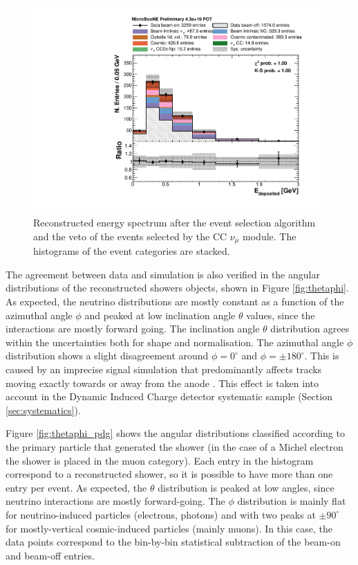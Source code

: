 \begin{figure}[htbp]
\centering
  \includegraphics[width=0.65\linewidth]{figures/h_fixed_energy.pdf}
  \caption{Reconstructed energy spectrum after the event selection algorithm and the veto of the events selected by the CC $\nu_{\mu}$ module. The histograms of the event categories are stacked.}
  \label{fig:spectrum}
\end{figure}

The agreement between data and simulation is also verified in the angular distributions of the reconstructed showers objects, shown in Figure \ref{fig:thetaphi}. As expected, the neutrino distributions are mostly constant as a function of the azimuthal angle $\phi$ and peaked at low inclination angle $\theta$ values, since the interactions are mostly forward going. The inclination angle $\theta$ distribution agrees within the uncertainties both for shape and normalisation. The azimuthal angle $\phi$ distribution shows a slight disagreement around $\phi = 0^{\circ}$ and $\phi = \pm180^{\circ}$. This is caused by an imprecise signal simulation that predominantly affects tracks moving exactly towards or away from the anode \cite{Adams:2018gbi}. This effect is taken into account in the Dynamic Induced Charge detector systematic sample (Section \ref{sec:systematics}). 

Figure \ref{fig:thetaphi_pdg} shows the angular distributions classified according to the primary particle that generated the shower (in the case of a Michel electron the shower is placed in the muon category). Each entry in the histogram correspond to a reconstructed shower, so it is possible to have more than one entry per event. As expected, the $\theta$ distribution is peaked at low angles, since neutrino interactions are mostly forward-going. The $\phi$ distribution is mainly flat for neutrino-induced particles (electrons, photons) and with two peaks at $\pm90^{\circ}$ for mostly-vertical cosmic-induced particles (mainly muons). In this case, the data points correspond to the bin-by-bin statistical subtraction of the beam-on and beam-off entries.

